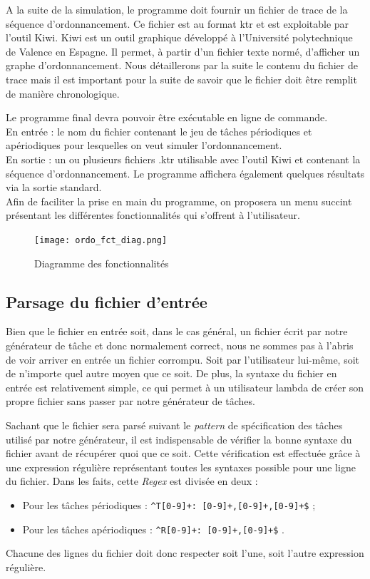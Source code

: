 		A la suite de la simulation, le programme doit fournir un fichier de trace de la séquence d'ordonnancement. Ce fichier est au format \og ktr \fg et est exploitable par l'outil Kiwi. 
		Kiwi est un outil graphique développé à l'Université polytechnique de Valence en Espagne. Il permet, à partir d'un fichier texte normé, d'afficher un graphe d'ordonnancement. Nous détaillerons par la suite le contenu du fichier de trace mais il est important pour la suite de savoir que le fichier doit être remplit de manière chronologique.
		
		Le programme final devra pouvoir être exécutable en ligne de commande.\\
		
		En entrée : le nom du fichier contenant le jeu de tâches périodiques et apériodiques pour lesquelles on veut simuler l'ordonnancement.\\
		
		En sortie : un ou plusieurs fichiers .ktr utilisable avec l'outil Kiwi et contenant la séquence d'ordonnancement. Le programme affichera également quelques résultats via la sortie standard.\\
	
		Afin de faciliter la prise en main du programme, on proposera un menu succint présentant les différentes fonctionnalités qui s'offrent à l'utilisateur.
		
			\begin{figure}[!h]
				\centering
				\texttt{[image: ordo\_fct\_diag.png]}
				\caption{Diagramme des fonctionnalités}
			\end{figure}
			\FloatBarrier
			
			\subsection{Parsage du fichier d'entrée}
				Bien que le fichier en entrée soit, dans le cas général, un fichier écrit par notre générateur de tâche et donc normalement correct, nous ne sommes pas à l'abris de voir arriver en entrée un fichier corrompu. Soit par l'utilisateur lui-même, soit de n'importe quel autre moyen que ce soit. De plus, la syntaxe du fichier en entrée est relativement simple, ce qui permet à un utilisateur lambda de créer son propre fichier sans passer par notre générateur de tâches.
				
				Sachant que le fichier sera parsé suivant le \emph{pattern} de spécification des tâches utilisé par notre générateur, il est indispensable de vérifier la bonne syntaxe du fichier avant de récupérer quoi que ce soit. Cette vérification est effectuée grâce à une expression régulière représentant toutes les syntaxes possible pour une ligne du fichier. Dans les faits, cette \emph{Regex} est divisée en deux :
				\begin{itemize}
					\item Pour les tâches périodiques : \verb|^T[0-9]+: [0-9]+,[0-9]+,[0-9]+$| ;
					\item Pour les tâches apériodiques : \verb|^R[0-9]+: [0-9]+,[0-9]+$| .
				\end{itemize}
				Chacune des lignes du fichier doit donc respecter soit l'une, soit l'autre expression régulière.\\
				
